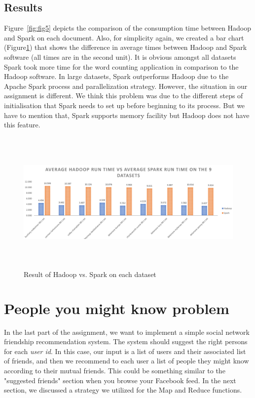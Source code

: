 \documentclass[12pt]{article}
\begin{document}
\newpage

\subsection{Results}
\noindent Figure~\ref{fig:fig5} depicts the comparison of the consumption time between Hadoop and Spark on each document. Also, for simplicity again, we created a bar chart (Figure\ref{fig:fig6}) that shows the difference in average times between Hadoop and Spark software (all times are in the second unit). It is obvious amongst all datasets Spark took more time for the word counting application in comparison to the Hadoop software. In large datasets, Spark outperforms Hadoop due to the Apache Spark process and parallelization strategy. However, the situation in our assignment is different. We think this problem was due to the different steps of initialisation that Spark needs to set up before beginning to its process. But we have to mention that, Spark supports memory facility but Hadoop does not have this feature. 

\begin{figure}[h]
    \centering
    \includegraphics[width=140mm, height=70mm, scale=1.0]{images/Hadoop_vs_Spark_graph.PNG}
    \caption{Result of Hadoop vs. Spark on each dataset}
    \label{fig:fig6}
\end{figure}

\newpage

\section{People you might know problem}

In the last part of the assignment, we want to implement a simple social network friendship recommendation system. The system should suggest the right persons for each \textit{user id}. In this case, our input is a list of users and their associated list of friends, and then we recommend to each user a list of people they might know according to their mutual friends. This could be something similar to the "suggested friends" section when you browse your Facebook feed. In the next section, we discussed a strategy we utilized for the Map and Reduce functions. 
\end{document}
